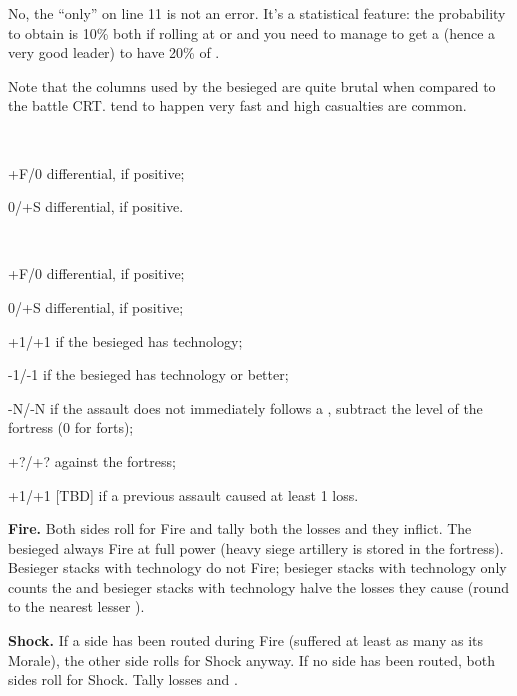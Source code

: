 \begin{designnote}
  No, the ``only'' \textetoile\textetoile on line 11 is not an error. It's a
  statistical feature: the probability to obtain
  \textetoile\textetoile\textetoile is 10\% both if rolling at  or
   and you need to manage to get a  (hence a very good
  leader) to have 20\% of \textetoile\textetoile\textetoile.
\end{designnote}

Note that the columns used by the besieged are quite brutal when compared to
the battle CRT. \textetoile tend to happen very fast and high casualties are
common.

~\\
\begin{modlist}
\item[+F/0] \Fire differential, if positive;
\item[0/+S] \Shock differential, if positive.
\end{modlist}

~\\
\begin{modlist}
\item[+F/0] \Fire differential, if positive;
\item[0/+S] \Shock differential, if positive;
\item[+1/+1] if the besieged has \TMED technology;
\item[-1/-1] if the besieged has \TARQ technology or better;
\item[-N/-N] if the assault does not immediately follows a ,
  subtract the level of the fortress (0 for forts);
\item[+?/+?]  against the fortress;
\item[+1/+1] [TBD] if a previous assault caused at least 1 loss. %
\end{modlist}

\textbf{Fire.} Both sides roll for Fire and tally both the losses and
\textetoile they inflict. The besieged always Fire at full power (heavy siege
artillery is stored in the fortress). Besieger stacks with \TMED technology do
not Fire; besieger stacks with \TREN technology only counts the \textetoile
and besieger stacks with \TARQ technology halve the losses they cause (round
to the nearest lesser \texttu).

\textbf{Shock.} If a side has been routed during Fire (suffered at least as
many \textetoile as its Morale), the other side rolls for Shock anyway. If no
side has been routed, both sides roll for Shock. Tally losses and \textetoile.

